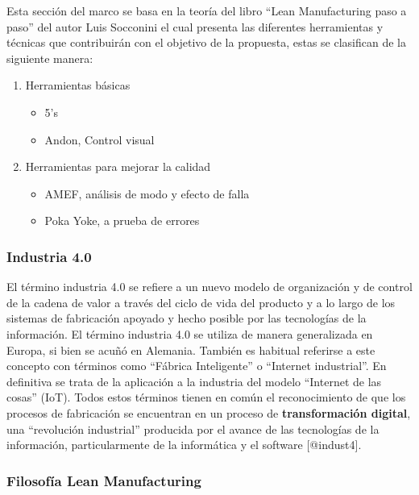 \documentclass[11pt]{article}
\providecommand{\tightlist}{%
      \setlength{\itemsep}{0pt}\setlength{\parskip}{0pt}}
\begin{document}
Esta sección del marco se basa en la teoría del libro ``Lean
Manufacturing paso a paso'' del autor Luis Socconini el cual presenta
las diferentes herramientas y técnicas que contribuirán con el objetivo
de la propuesta, estas se clasifican de la siguiente manera:

\begin{enumerate}
\def\labelenumi{\arabic{enumi}.}
\tightlist
\item
  Herramientas básicas

  \begin{itemize}
  \tightlist
  \item
    5's
  \item
    Andon, Control visual
  \end{itemize}
\item
  Herramientas para mejorar la calidad

  \begin{itemize}
  \tightlist
  \item
    AMEF, análisis de modo y efecto de falla
  \item
    Poka Yoke, a prueba de errores
  \end{itemize}
\end{enumerate}

\hypertarget{industria-4.0}{%
\subsubsection{Industria 4.0}\label{industria-4.0}}

El término industria 4.0 se refiere a un nuevo modelo de organización y
de control de la cadena de valor a través del ciclo de vida del producto
y a lo largo de los sistemas de fabricación apoyado y hecho posible por
las tecnologías de la información. El término industria 4.0 se utiliza
de manera generalizada en Europa, si bien se acuñó en Alemania. También
es habitual referirse a este concepto con términos como ``Fábrica
Inteligente'' o ``Internet industrial''. En definitiva se trata de la
aplicación a la industria del modelo ``Internet de las cosas'' (IoT).
Todos estos términos tienen en común el reconocimiento de que los
procesos de fabricación se encuentran en un proceso de
\textbf{transformación digital}, una ``revolución industrial'' producida
por el avance de las tecnologías de la información, particularmente de
la informática y el software {[}@indust4{]}.

\hypertarget{filosofuxeda-lean-manufacturing}{%
\subsubsection{Filosofía Lean
Manufacturing}\label{filosofuxeda-lean-manufacturing}}
\end{document}
